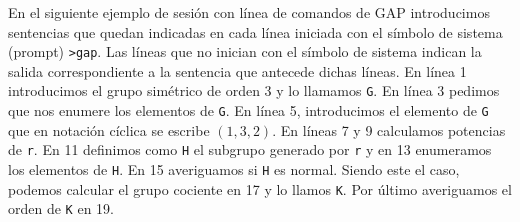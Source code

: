 \begin{subappendices}
\begin{ejemplo} En el siguiente ejemplo de sesión con línea de comandos de GAP introducimos sentencias que quedan indicadas en cada línea iniciada con el símbolo de sistema (prompt) \verb~>gap~. Las líneas que no inician con el símbolo de sistema indican la salida correspondiente a la sentencia que antecede dichas líneas. En línea 1 introducimos el grupo simétrico de orden 3 y lo llamamos \texttt{G}. En línea 3 pedimos que nos enumere los elementos de \texttt{G}. En línea 5, introducimos el elemento de \texttt{G} que en notación cíclica se escribe $(1,3,2)$. En líneas 7 y 9 calculamos potencias de \texttt{r}. En 11 definimos como \texttt{H} el subgrupo generado por
\texttt{r} y en 13 enumeramos los elementos de \texttt{H}. En 15 averiguamos si \texttt{H} es normal. Siendo este el caso, podemos calcular el grupo cociente en 17 y lo llamos \texttt{K}. Por último averiguamos el orden de \texttt{K} en 19.


\end{ejemplo}




\end{subappendices}
\nocite{*}
  
  


%

